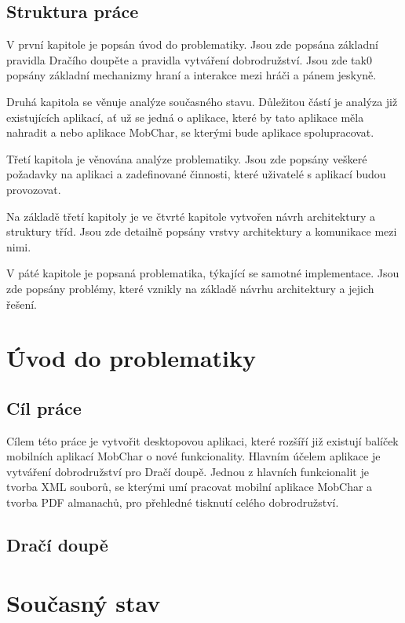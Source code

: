 \documentclass[thesis=B,czech]{resources/FITthesis}[2012/06/26]
\begin{document}
\begin{introduction}
\section*{Struktura práce}
V první kapitole je popsán úvod do problematiky. Jsou zde popsána základní pravidla Dračího doupěte a pravidla vytváření dobrodružství. Jsou zde tak0 popsány základní mechanizmy hraní a interakce mezi hráči a pánem jeskyně.

Druhá kapitola se věnuje analýze současného stavu. Důležitou částí je analýza již existujících aplikací, ať už se jedná o aplikace, které by tato aplikace měla nahradit a nebo aplikace MobChar, se kterými bude aplikace spolupracovat.

Třetí kapitola je věnována analýze problematiky. Jsou zde popsány veškeré požadavky na aplikaci a zadefinované činnosti, které uživatelé s aplikací budou provozovat.

Na základě třetí kapitoly je ve čtvrté kapitole vytvořen návrh architektury a struktury tříd. Jsou zde detailně popsány vrstvy architektury a komunikace mezi nimi.

V páté kapitole je popsaná problematika, týkající se samotné implementace. Jsou zde popsány problémy, které vznikly na základě návrhu architektury a jejich řešení.


\end{introduction}

\chapter{Úvod do problematiky}

	\section{Cíl práce}
Cílem této práce je vytvořit desktopovou aplikaci, které rozšíří již existují balíček mobilních aplikací MobChar o nové funkcionality. Hlavním účelem aplikace je vytváření dobrodružství pro Dračí doupě. Jednou z hlavních funkcionalit je tvorba XML souborů, se kterými umí pracovat mobilní aplikace MobChar a tvorba PDF almanachů, pro přehledné tisknutí celého dobrodružství.
	\section{Dračí doupě}




\chapter{Současný stav}
\end{document}
